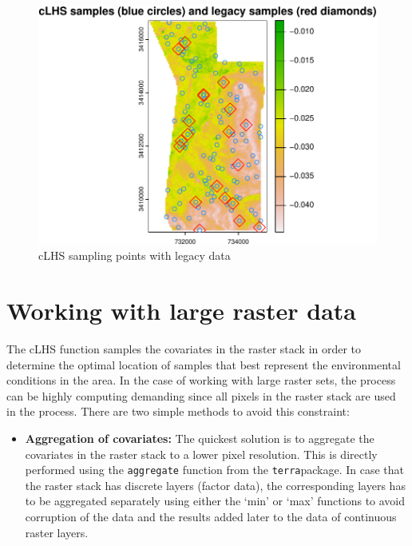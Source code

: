\documentclass[
  10pt,
  b5paper,
  oneside]{book}
\providecommand{\tightlist}{%
  \setlength{\itemsep}{0pt}\setlength{\parskip}{0pt}}
\begin{document}
\begin{figure}
\centering
\includegraphics{Technical-Manual-Soil-Sampling-Design_files/figure-latex/fig-18-1.pdf}
\caption{\label{fig:fig-18}cLHS sampling points with legacy data}
\end{figure}

\hypertarget{working-with-large-raster-data}{%
\section{Working with large raster data}\label{working-with-large-raster-data}}

The cLHS function samples the covariates in the raster stack in order to determine the optimal location of samples that best represent the environmental conditions in the area. In the case of working with large raster sets, the process can be highly computing demanding since all pixels in the raster stack are used in the process. There are two simple methods to avoid this constraint:

\begin{itemize}
\tightlist
\item
  \textbf{Aggregation of covariates:} The quickest solution is to aggregate the covariates in the raster stack to a lower pixel resolution. This is directly performed using the \texttt{\textquotesingle{}aggregate\textquotesingle{}} function from the \texttt{\textquotesingle{}terra\textquotesingle{}}package. In case that the raster stack has discrete layers (factor data), the corresponding layers has to be aggregated separately using either the `min' or `max' functions to avoid corruption of the data and the results added later to the data of continuous raster layers.
\end{itemize}
\end{document}
